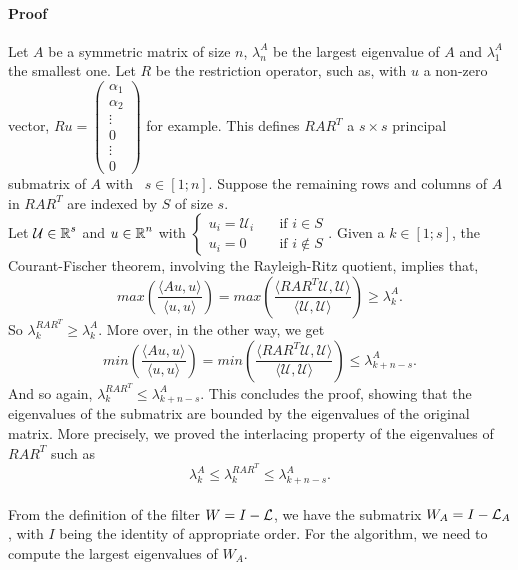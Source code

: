 \paragraph{Proof}
Let \(A\) be a symmetric matrix of size \(n\), \(\lambda^A_n\) be the largest eigenvalue of \(A\) and \(\lambda^A_1\) the smallest one.
Let \(R\) be the restriction operator, such as, with \(u\) a non-zero vector, \(Ru = \begin{pmatrix}\alpha_1 \\ \alpha_2 \\ \vdots \\ 0 \\ \vdots \\ 0 \end{pmatrix}\) for example.
This defines \(RAR^T\) a \(s \times s\) principal submatrix of \(A\) with  \(s \in [1; n]\).
Suppose the remaining rows and columns of \(A\) in \(RAR^T\) are indexed by \(S\) of size \(s\). \\
Let \(\mathcal{U} \in \operatorname{\mathbb{R}}^s\) and \(u \in \operatorname{\mathbb{R}}^n\) with \(\begin{cases} u_i = \mathcal{U}_i & \quad \text{if } i \in S \\ u_i = 0 & \quad \text{if } i \notin S \end{cases}\).
Given a \(k \in [1; s]\), the Courant-Fischer theorem, involving the Rayleigh-Ritz quotient, implies that,
\[max\left(\frac{\langle Au, u \rangle}{\langle u, u\rangle}\right) = max\left(\frac{\langle RAR^T\mathcal{U}, \mathcal{U}\rangle}{\langle \mathcal{U}, \mathcal{U} \rangle}\right) \ge \lambda^A_k.\]
So \(\lambda^{RAR^T}_k \ge \lambda^A_k\).
More over, in the other way, we get
\[min\left(\frac{\langle Au, u \rangle}{\langle u, u\rangle}\right) = min\left(\frac{\langle RAR^T\mathcal{U}, \mathcal{U}\rangle}{\langle \mathcal{U}, \mathcal{U} \rangle}\right) \le \lambda^A_{k+n-s}.\]
And so again, \(\lambda^{RAR^T}_k \le \lambda^A_{k+n-s}\).
This concludes the proof, showing that the eigenvalues of the submatrix are bounded by the eigenvalues of the original matrix.
More precisely, we proved the interlacing property of the eigenvalues of \(RAR^T\) such as
\[\lambda^A_k \le \lambda^{RAR^T}_k \le \lambda^A_{k+n-s}.\]

\paragraph{}
From the definition of the filter \(W = I - \operatorname{\mathcal{L}}\), we have the submatrix \(W_A = I - \operatorname{\mathcal{L}}_A\), with \(I\) being the identity of appropriate order.
For the algorithm, we need to compute the largest eigenvalues of \(W_A\).

